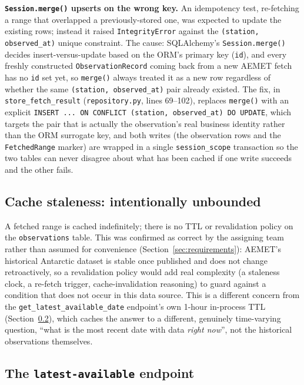 \documentclass[11pt,a4paper]{article}
\begin{document}
\textbf{\texttt{Session.merge()} upserts on the wrong key.} An idempotency
test, re-fetching a range that overlapped a previously-stored one, was
expected to update the existing rows; instead it raised
\texttt{IntegrityError} against the \texttt{(station, observed\_at)}
unique constraint. The cause: SQLAlchemy's \texttt{Session.merge()} decides
insert-versus-update based on the ORM's primary key (\texttt{id}), and
every freshly constructed \texttt{ObservationRecord} coming back from a new
AEMET fetch has no \texttt{id} set yet, so \texttt{merge()} always treated
it as a new row regardless of whether the same \texttt{(station,
observed\_at)} pair already existed. The fix, in
\texttt{store\_fetch\_result} (\texttt{repository.py}, lines 69--102),
replaces \texttt{merge()} with an explicit
\texttt{INSERT ... ON CONFLICT (station, observed\_at) DO UPDATE}, which
targets the pair that is actually the observation's real business identity
rather than the ORM surrogate key, and both writes (the observation rows
and the \texttt{FetchedRange} marker) are wrapped in a single
\texttt{session\_scope} transaction so the two tables can never disagree
about what has been cached if one write succeeds and the other fails.

\subsection{Cache staleness: intentionally unbounded}

A fetched range is cached indefinitely; there is no TTL or revalidation
policy on the \texttt{observations} table. This was confirmed as correct
by the assigning team rather than assumed for convenience
(Section~\ref{sec:requirements}): AEMET's historical Antarctic dataset is
stable once published and does not change retroactively, so a
revalidation policy would add real complexity (a staleness clock, a
re-fetch trigger, cache-invalidation reasoning) to guard against a
condition that does not occur in this data source. This is a different
concern from the \texttt{get\_latest\_available\_date} endpoint's own
1-hour in-process TTL (Section~\ref{sec:latest-available}), which caches
the answer to a different, genuinely time-varying question, ``what is the
most recent date with data \emph{right now}'', not the historical
observations themselves.

\subsection{The \texttt{latest-available} endpoint}
\label{sec:latest-available}
\end{document}
